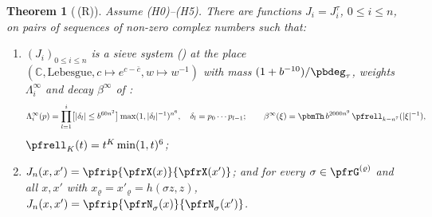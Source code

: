 \documentclass[10pt]{amsart}
\newtheorem{theorem}{Theorem}[section]
\theoremstyle{definition}
\theoremstyle{remark}
\newcommand{\C}{\mathbb C}
\begin{document}
\begin{theorem}[{\cite[Theorem~3.51]{P51}}\,\textup{(R)}]\label{pfr:R}
Assume \textup{(H0)}--\textup{(H5)}. There are functions $J_i=J^\tau_i$, $0\le i\le n$, on pairs of
sequences of non-zero complex numbers such that:
\begin{enumerate}
\item[(R-a)] $(J_i)_{0\le i\le n}$ is a sieve system ({\cite[Definition~3.44]{P51}}) at the place
$(\C,\text{Lebesgue},c\mapsto e^{c-\bar c},w\mapsto w^{-1})$ with mass $(1+b^{-10})/\pbdeg_\tau$,
weights $\Lambda^\infty_i$ and decay $\beta^\infty$ of {\cite[(38)]{P51}}:
\[
\Lambda^\infty_i(p)=\prod_{l=1}^i\bigl[|\delta_l|\le b^{60n^2}\bigr]\max(1,|\delta_l|^{-1})^{n^6},\quad
\delta_l=p_0\cdots p_{l-1};\qquad\beta^\infty(\xi)=\pbmTh\,b^{2000n^9}\,\pfrell_{k-n^7}(|\xi|^{-1}),
\]
$\pfrell_K(t)=t^K\min(1,t)^6$;
\item[(R-b)] $J_n(x,x')=\pfrip{\pfrX(x)}{\pfrX(x')}$; and for every $\sigma\in\pfrG^{(\varrho)}$ and all $x,x'$
with $x_\varrho=x'_\varrho=h(\sigma z,z)$, $J_n(x,x')=\pfrip{\pfrN_\sigma(x)}{\pfrN_\sigma(x')}$.
\end{enumerate}
\end{theorem}
\end{document}
